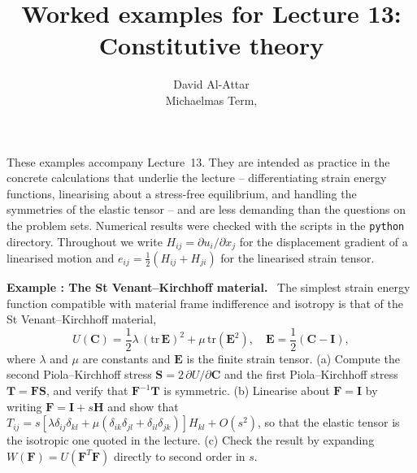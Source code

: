 \documentclass[a4paper,12pt]{paper}
\title{Worked examples for Lecture 13: Constitutive theory}
\author{David Al-Attar \\ Michaelmas Term, \the\year}
\newcounter{example}
\renewenvironment{example}[1]{%
  \refstepcounter{example}%
  \begin{mdframed}[linewidth=1pt,innertopmargin=6pt,innerbottommargin=6pt]%
  \noindent\textbf{Example \theexample: #1.}\ }{%
  \end{mdframed}}
\begin{document}
\maketitle

\noindent These examples accompany Lecture~13. They are intended as practice in the concrete
calculations that underlie the lecture -- differentiating strain energy functions, linearising
about a stress-free equilibrium, and handling the symmetries of the elastic tensor -- and are
less demanding than the questions on the problem sets. Numerical results were checked with the
scripts in the \texttt{python} directory. Throughout we write $H_{ij}=\partial u_{i}/\partial x_{j}$
for the displacement gradient of a linearised motion and
$e_{ij}=\frac{1}{2}(H_{ij}+H_{ji})$ for the linearised strain tensor.

\begin{example}{The St Venant--Kirchhoff material}
The simplest strain energy function compatible with material frame indifference and isotropy is
that of the St Venant--Kirchhoff material,
\begin{equation}
U(\mathbf{C})=\frac{1}{2}\lambda\,(\mathrm{tr}\,\mathbf{E})^{2}+\mu\,\mathrm{tr}(\mathbf{E}^{2}),\quad
\mathbf{E}=\frac{1}{2}(\mathbf{C}-\mathbf{I}),
\label{eq:1}
\end{equation}
where $\lambda$ and $\mu$ are constants and $\mathbf{E}$ is the finite strain tensor.
(a) Compute the second Piola--Kirchhoff stress $\mathbf{S}=2\,\partial U/\partial\mathbf{C}$ and the
first Piola--Kirchhoff stress $\mathbf{T}=\mathbf{F}\mathbf{S}$, and verify that $\mathbf{F}^{-1}\mathbf{T}$
is symmetric. (b) Linearise about $\mathbf{F}=\mathbf{I}$ by writing $\mathbf{F}=\mathbf{I}+s\mathbf{H}$
and show that
$T_{ij}=s\left[\lambda\delta_{ij}\delta_{kl}+\mu(\delta_{ik}\delta_{jl}+\delta_{il}\delta_{jk})\right]H_{kl}+O(s^{2})$,
so that the elastic tensor is the isotropic one quoted in the lecture. (c) Check the result by
expanding $W(\mathbf{F})=U(\mathbf{F}^{T}\mathbf{F})$ directly to second order in $s$.
\end{example}
\end{document}
